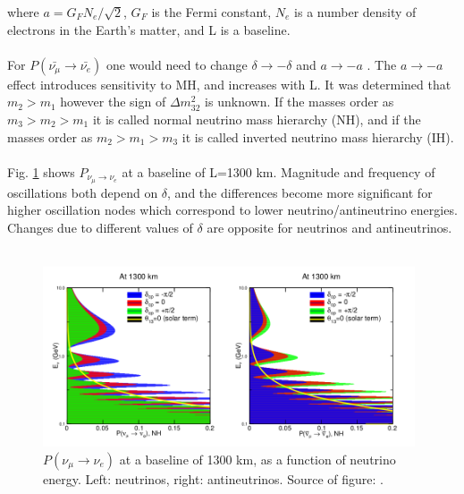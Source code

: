 where $a={G_F}{N_e}/\sqrt{2}$, $G_F$ is the Fermi constant, $N_e$ is a number density of electrons in the Earth's matter, and L is a baseline.\\ \\
For $P(\bar{\nu_\mu} \rightarrow \bar{\nu_e})$ one would need to change $\delta \rightarrow -\delta$ and $a \rightarrow -a$ \cite{ref_theory_Osc}. The $a \rightarrow -a$ effect introduces sensitivity to MH, and increases with L. It was determined that $m_2>m_1$ however the sign of ${\Delta}m_{32}^2$ is unknown. If the masses order as $m_3 > m_2 > m_1$ it is called normal neutrino mass hierarchy (NH), and if the masses order as $m_2 > m_1 > m_3$ it is called inverted neutrino mass hierarchy (IH).\\ \\
Fig. \ref{fig:LBNF_oscProbability} shows $P_{\nu_\mu \rightarrow \nu_e}$ at a baseline of L=1300 km. Magnitude and frequency of oscillations both depend on $\delta$, and the differences become more significant for higher oscillation nodes which correspond to lower neutrino/antineutrino energies. Changes due to different values of $\delta$ are opposite for neutrinos and antineutrinos.\\ \\
\begin{figure}
\caption{$P(\nu_\mu \rightarrow \nu_e)$ at a baseline of 1300 km, as a function of neutrino energy. Left: neutrinos, right: antineutrinos. Source of figure: \cite{ref_LBNF_CDR}.}
\label{fig:LBNF_oscProbability}
\centering
\includegraphics[width=0.98\textwidth, keepaspectratio=true]{figs/LBNF_oscProbability.png} 
\end{figure}

